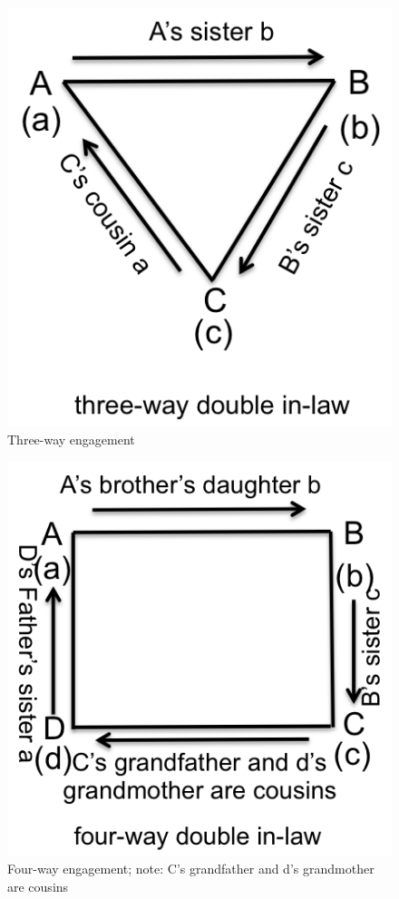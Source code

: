 \begin{figure}
\center
\includegraphics{figures/engagement/triple_3}
\caption{Three-way engagement
\label{figure:engage_3}}
\end{figure}

\begin{figure}
\center
\includegraphics{figures/engagement/four_4}
\caption{Four-way engagement; note: C's grandfather and d's grandmother are cousins
\label{figure:engage_4}}
\end{figure}

